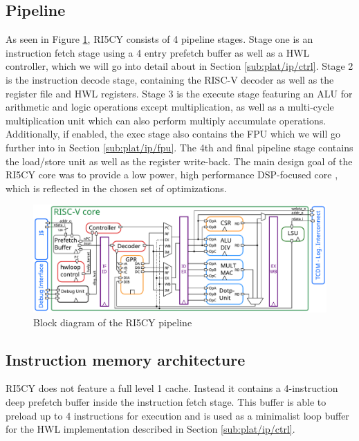 \documentclass[../bachelor_paper.tex]{subfiles}
\begin{document}
\subsection{Pipeline}
    \label{sec:plat/pipe}
As seen in Figure \ref{fig:plat/base/blockdia}, RI5CY consists of 4 pipeline stages. Stage one is an instruction fetch stage using a 4 entry prefetch buffer as well as a \ac{HWL} controller, which we will go into detail about in Section \ref{sub:plat/ip/ctrl}. Stage 2 is the instruction decode stage, containing the RISC-V decoder as well as the register file and \ac{HWL} registers. Stage 3 is the execute stage featuring an \ac{ALU} for arithmetic and logic operations except multiplication, as well as a multi-cycle multiplication unit which can also perform multiply accumulate operations. Additionally, if enabled, the exec stage also contains the \ac{FPU} which we will go further into in Section \ref{sub:plat/ip/fpu}. The 4th and final pipeline stage contains the load/store unit as well as the register write-back. The main design goal of the RI5CY core was to provide a low power, high performance \ac{DSP}-focused core \cite{gautschiNearThresholdRISCVCore2017}, which is reflected in the chosen set of optimizations.

\begin{figure}
    \centering
    \includegraphics[width=\textwidth]{img/ri5cy_blockdiagram.pdf}
    \caption{Block diagram of the RI5CY pipeline}
    \label{fig:plat/base/blockdia}
\end{figure}

\subsection{Instruction memory architecture}
RI5CY does not feature a full level 1 cache. Instead it contains a 4-instruction deep prefetch buffer inside the instruction fetch stage. This buffer is able to preload up to 4 instructions for execution and is used as a minimalist loop buffer for the \ac{HWL} implementation described in Section \ref{sub:plat/ip/ctrl}.
\end{document}
